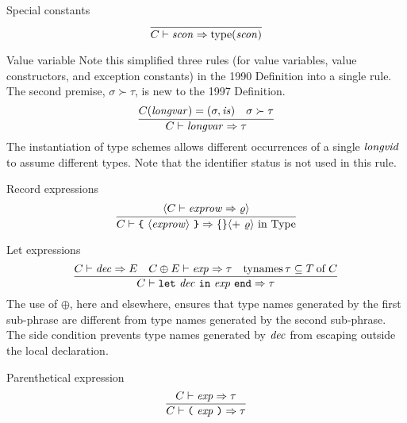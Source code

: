 
\begin{sml-rule}{Special constants}
\begin{equation}\label{rule:static-core:special-constants}
\vcenter{\infer{\C\ts\scon\ra\scontype(\scon)}{}}
\end{equation}
\end{sml-rule}

\begin{sml-rule}{Value variable}
Note this simplified three rules (for value variables, value
constructors, and exception constants) in the 1990 Definition into a single
rule. The second premise, $\sigma\succ\tau$, is new to the 1997 Definition.
\begin{equation}\label{rule:static-core:value-variable}
\vcenter{\infer{\C\ts\longvar\ra\tau}{\C(\longvar)= (\sigma,\is) & \sigma\succ\tau}}
\end{equation}
The instantiation of type schemes allows different occurrences of a
single $\textit{longvid\/}$ to assume different types. Note that the identifier
status is not used in this rule.
\end{sml-rule}

\begin{sml-rule}{Record expressions}
\begin{equation}
\vcenter{\infer{\C\ts\ttlbrace\ \optional{\labexps}\ \ttrbrace\ra\emptymap\optional{+\ \varrho}{\rm\ in\ \Type}}{\optional{\C\ts\labexps\ra\varrho}}}
\end{equation}
\end{sml-rule}

\begin{sml-rule}{Let expressions}
\begin{equation}\label{rule:static-core:let-expression}
  \vcenter{\infer{\C\ts\letexp\ra\tau}%
    {\C\ts\dec\ra\E
      & \C\oplus\E\ts\exp\ra\tau
      & \TyNamesFcn\tau\subseteq\of{\T}{\C}}}
\end{equation}
The use of $\oplus$, here and elsewhere, ensures that
type names generated by the first sub-phrase are different from 
type names generated by the second sub-phrase. The side condition
prevents type names generated by $\textit{dec\/}$ from escaping outside the local declaration.
\end{sml-rule}

\begin{sml-rule}{Parenthetical expression}
\begin{equation}\label{rule:syntax-core:atexp:paren}
\vcenter{\infer{\C\ts\parexp\ra\tau}{\C\ts\exp\ra\tau}}
\end{equation}
\end{sml-rule}

